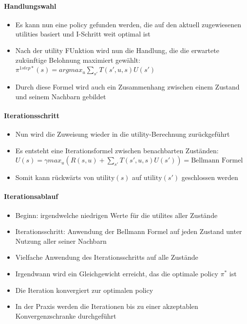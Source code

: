 \paragraph{Handlungswahl}
\begin{itemize}
	\item Es kann nun eine policy gefunden werden, die auf den aktuell zugewiesenen utilities basiert und I-Schritt weit optimal ist
	\item Nach der utility FUnktion wird nun die Handlung, die die erwartete zuk\"unftige Belohnung maximiert gew\"ahlt: $\pi^{1step*}(s) = argmax_u \sum_{s'} T(s', u, s) U(s')$
	\item Durch diese Formel wird auch ein Zusammenhang zwischen einem Zustand und seinem Nachbarn gebildet
\end{itemize}

\paragraph{Iterationsschritt}
\begin{itemize}
	\item Nun wird die Zuweisung wieder in die utility-Berechnung zur\"uckgef\"uhrt
	\item Es entsteht eine Iterationsformel zwischen benachbarten Zust\"anden:
	$U(s) = \gamma max_u (R(s,u) + \sum_{s'} T(s', u, s) U(s')) = \text{Bellmann Formel}$
	\item Somit kann r\"uckw\"arts von $\text{utility}(s)$ auf $\text{utility}(s')$ geschlossen werden
\end{itemize}

\paragraph{Iterationsablauf}
\begin{itemize}
	\item Beginn: irgendwelche niedrigen Werte f\"ur die utilites aller Zust\"ande
	\item Iterationsschritt: Anwendung der Bellmann Formel auf jeden Zustand unter Nutzung aller seiner Nachbarn
	\item Vielfache Anwendung des Iterationsschritts auf alle Zust\"ande
	\item Irgendwann wird ein Gleichgewicht erreicht, das die optimale policy $\pi^*$ ist
	\item Die Iteration konvergiert zur optimalen policy
	\item In der Praxis werden die Iterationen bis zu einer akzeptablen Konvergenzschranke durchgef\"uhrt
\end{itemize}

